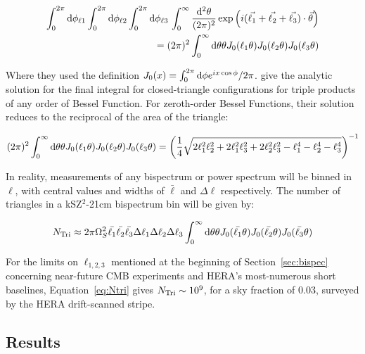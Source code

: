 \begin{equation}
\begin{split}
\int^{2\pi}_0 {\rm d}\phi_{\ell1} \int^{2\pi}_0 {\rm d}\phi_{\ell2} \int^{2\pi}_0 {\rm d}\phi_{\ell3} \,\int^{\infty}_0 \frac{{\rm d^2\theta}}{(2\pi)^2}\exp\left(i(\vec{\ell_1}+\vec{\ell_2}+\vec{\ell_3})\cdot\vec{\theta}\right)\\
= (2\pi)^2\int^{\infty}_0 {\rm d}\theta \theta J_0(\ell_1\theta)J_0(\ell_2\theta)J_0(\ell_3\theta)
\end{split}
\end{equation}

Where they used the definition $J_0(x) = \int^{2\pi}_0 {\rm d}\phi e^{ix\cos\phi}/2\pi$. \cite{gradshteyn2000table} give the analytic solution for the final integral for closed-triangle configurations for triple products of any order of Bessel Function. For zeroth-order Bessel Functions, their solution reduces to the reciprocal of the area of the triangle:

\begin{equation}
(2\pi)^2\int^{\infty}_0 {\rm d}\theta \theta J_0(\ell_1\theta)J_0(\ell_2\theta)J_0(\ell_3\theta) = \left( \frac{1}{4}\sqrt{2\ell_1^2\ell_2^2 + 2\ell_1^2\ell_3^2 + 2\ell_2^2\ell_3^2 - \ell_1^4 - \ell_2^4 - \ell_3^4} \right)^{-1}
\end{equation}

In reality, measurements of any bispectrum or power spectrum will be binned in $\ell$, with central values and widths of $\bar{\ell}$ and $\Delta\ell$ respectively. The number of triangles in a kSZ$^2$-21cm bispectrum bin will be given by:

\begin{equation}
N_{\rm Tri} \approx 2\pi\Omega_S^2\bar{\ell_1}\bar{\ell_2}\bar{\ell_3}\Delta\ell_1\Delta\ell_2 \Delta\ell_3 \int^{\infty}_0 {\rm d}\theta \theta J_0(\bar{\ell_1}\theta)J_0(\bar{\ell_2}\theta)J_0(\bar{\ell_3}\theta)
\label{eq:Ntri}
\end{equation}

For the limits on $\ell_{1,2,3}$ mentioned at the beginning of Section~\ref{sec:bispec} concerning near-future CMB experiments and HERA's most-numerous short baselines, Equation~\ref{eq:Ntri} gives $N_{\rm Tri}\sim10^9$, for a sky fraction of 0.03, surveyed by the HERA drift-scanned stripe.

\subsection{Results}

